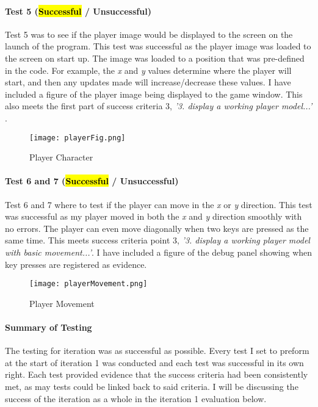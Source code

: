 \documentclass[12pt]{report}
\begin{document}
\paragraph{Test 5 (\hl{Successful} / Unsuccessful)}
Test 5 was to see if the player image would be displayed to the screen on the launch of the program. This test was successful as the player image was loaded to the screen on start up. The image was loaded to a position that was pre-defined in the code. For example, the \textit{x} and \textit{y} values determine where the player will start, and then any updates made will increase/decrease these values. I have included a figure of the player image being displayed to the game window. This also meets the first part of success criteria 3, \textit{'3. display a working player model...' }.

\begin{figure}[H]
    \centering
    \texttt{[image: playerFig.png]}
    \caption{Player Character}
    \label{fig3}
\end{figure}

\pagebreak

\paragraph{Test 6 and 7 (\hl{Successful} / Unsuccessful)}
Test 6 and 7 where to test if the player can move in the \textit{x} or \textit{y} direction. This test was successful as my player moved in both the \textit{x} and \textit{y} direction smoothly with no errors. The player can even move diagonally when two keys are pressed as the same time. This meets success criteria point 3, \textit{'3. display a working player model with basic movement...'}. I have included a figure of the debug panel showing when key presses are registered as evidence.

\begin{figure}[H]
    \centering
    \texttt{[image: playerMovement.png]}
    \caption{Player Movement}
    \label{fig4}
\end{figure}

\paragraph{Summary of Testing}
The testing for iteration was as successful as possible. Every test I set to preform at the start of iteration 1 was conducted and each test was successful in its own right. Each test provided evidence that the success criteria had been consistently met, as may tests could be linked back to said criteria. I will be discussing the success of the iteration as a whole in the iteration 1 evaluation below.
\end{document}

